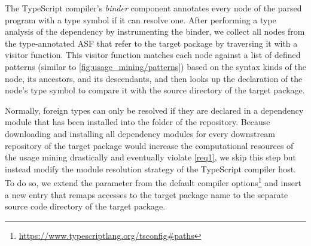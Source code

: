 The TypeScript compiler's \emph{binder} component annotates every node of the parsed program with a type symbol if it can resolve one.
After performing a type analysis of the dependency by instrumenting the binder, we collect all nodes from the type-annotated ASF that refer to the target package by traversing it with a visitor function.
This visitor function matches each node against a list of defined patterns (similar to \cref{fig:usage_mining/patterns}) based on the syntax kinds of the node, its ancestors, and its descendants, and then looks up the declaration of the node's type symbol to compare it with the source directory of the target package.

Normally, foreign types can only be resolved if they are declared in a dependency module that has been installed into the  folder of the repository.
Because downloading and installing all dependency modules for every downstream repository of the target package would increase the computational resources of the usage mining drastically and eventually violate \cref{req1}, we skip this step but instead modify the module resolution strategy of the TypeScript compiler host.
To do so, we extend the  parameter from the default compiler options\footnote{\url{https://www.typescriptlang.org/tsconfig\#paths}} and insert a new entry that remaps accesses to the target package name to the separate source code directory of the target package.

